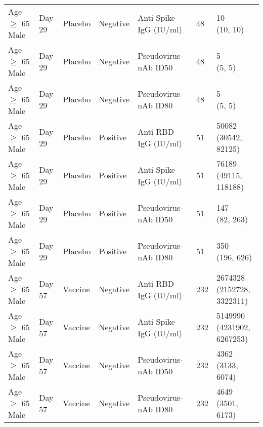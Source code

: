\documentclass[]{book}
\theoremstyle{definition}
\theoremstyle{definition}
\theoremstyle{definition}
\newcommand{\1}{\mathbbm{1}}
\begin{document}
\begin{landscape}
\begin{ThreePartTable}
\begin{longtable}[t]{>{\raggedright\arraybackslash}p{7cm}llllll}
\hspace{1em}Age $\geq$ 65 Male & Day 29 & Placebo & Negative & Anti Spike IgG (IU/ml) & 48 & \makecell[l]{10\\(10, 10)}\\
\hspace{1em}Age $\geq$ 65 Male & Day 29 & Placebo & Negative & Pseudovirus-nAb ID50 & 48 & \makecell[l]{5\\(5, 5)}\\
\hspace{1em}Age $\geq$ 65 Male & Day 29 & Placebo & Negative & Pseudovirus-nAb ID80 & 48 & \makecell[l]{5\\(5, 5)}\\
\hspace{1em}Age $\geq$ 65 Male & Day 29 & Placebo & Positive & Anti RBD IgG (IU/ml) & 51 & \makecell[l]{50082\\(30542, 82125)}\\
\hspace{1em}Age $\geq$ 65 Male & Day 29 & Placebo & Positive & Anti Spike IgG (IU/ml) & 51 & \makecell[l]{76189\\(49115, 118188)}\\
\hspace{1em}Age $\geq$ 65 Male & Day 29 & Placebo & Positive & Pseudovirus-nAb ID50 & 51 & \makecell[l]{147\\(82, 263)}\\
\hspace{1em}Age $\geq$ 65 Male & Day 29 & Placebo & Positive & Pseudovirus-nAb ID80 & 51 & \makecell[l]{350\\(196, 626)}\\
\hspace{1em}Age $\geq$ 65 Male & Day 57 & Vaccine & Negative & Anti RBD IgG (IU/ml) & 232 & \makecell[l]{2674328\\(2152728, 3322311)}\\
\hspace{1em}Age $\geq$ 65 Male & Day 57 & Vaccine & Negative & Anti Spike IgG (IU/ml) & 232 & \makecell[l]{5149990\\(4231902, 6267253)}\\
\hspace{1em}Age $\geq$ 65 Male & Day 57 & Vaccine & Negative & Pseudovirus-nAb ID50 & 232 & \makecell[l]{4362\\(3133, 6074)}\\
\hspace{1em}Age $\geq$ 65 Male & Day 57 & Vaccine & Negative & Pseudovirus-nAb ID80 & 232 & \makecell[l]{4649\\(3501, 6173)}\\

\end{longtable}
\end{ThreePartTable}
\end{landscape}
\end{document}
